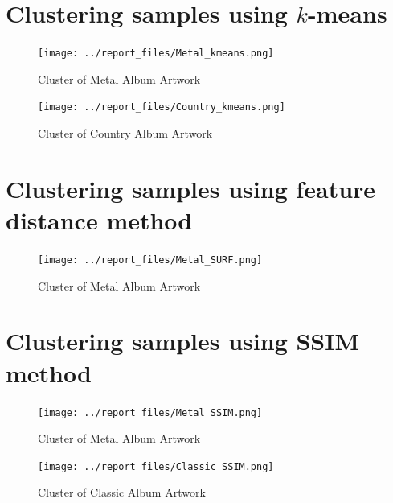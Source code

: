 \documentclass{article}
\begin{document}
\section{Clustering samples using $k$-means}

\begin{figure}[h!]
\centering
\texttt{[image: ../report\_files/Metal\_kmeans.png]}
\caption{Cluster of Metal Album Artwork}
\label{mk}
\end{figure}
\begin{figure}[h!]
\centering
\texttt{[image: ../report\_files/Country\_kmeans.png]}
\caption{Cluster of Country Album Artwork}
\label{ck}
\end{figure}

\section{Clustering samples using feature distance method}

\begin{figure}[h!]
\centering
\texttt{[image: ../report\_files/Metal\_SURF.png]}
\caption{Cluster of Metal Album Artwork}
\label{msu}
\end{figure}

\section{Clustering samples using SSIM method}

\begin{figure}[h!]
\centering
\texttt{[image: ../report\_files/Metal\_SSIM.png]}
\caption{Cluster of Metal Album Artwork}
\label{ms}
\end{figure}
\begin{figure}[h!]
\centering
\texttt{[image: ../report\_files/Classic\_SSIM.png]}
\caption{Cluster of Classic Album Artwork}
\label{cs}
\end{figure}
\end{document}
